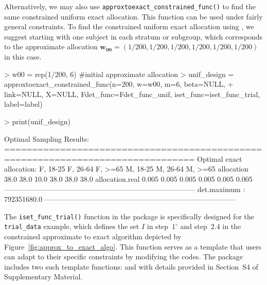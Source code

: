 Alternatively, we may also use \texttt{approxtoexact\_constrained\_func()} to find the same constrained uniform exact allocation. This function can be used under fairly general constraints. To find the constrained uniform exact allocation using \texttt{}, we suggest starting with one subject in each stratum or subgroup, which corresponds to the approximate allocation $\mathbf{w_{00}}=(1/200,1/200,1/200,1/200,1/200,1/200)$ in this case.

\begin{example}
  > w00 = rep(1/200, 6) #initial approximate allocation
  > unif_design = approxtoexact_constrained_func(n=200, w=w00, m=6, beta=NULL,
  + link=NULL, X=NULL, Fdet_func=Fdet_func_unif, iset_func=iset_func_trial, label=label)

  > print(unif_design)

  Optimal Sampling Results:
  ================================================================================
  Optimal exact allocation:
  F, 18-25 F, 26-64 F, >=65 M, 18-25 M, 26-64 M, >=65
  allocation      38.0     38.0     10.0    38.0     38.0     38.0
  allocation.real 0.005    0.005    0.005   0.005    0.005    0.005
  --------------------------------------------------------------------------------
  det.maximum :
  792351680.0
  --------------------------------------------------------------------------------

\end{example}

The \texttt{iset\_func\_trial()} function in the  package is specifically designed for the \texttt{trial\_data} example, which defines the set $I$ in step~$1^\circ$ and step~$2.4$ in the constrained approximate to exact algorithm depicted by Figure~\ref{fig:approx_to_exact_algo}. This function serves as a template that users can adapt to their specific constraints by modifying the codes. The package includes two such template functions: \texttt{} and \texttt{} with details provided in Section~S4 of Supplementary Material.

